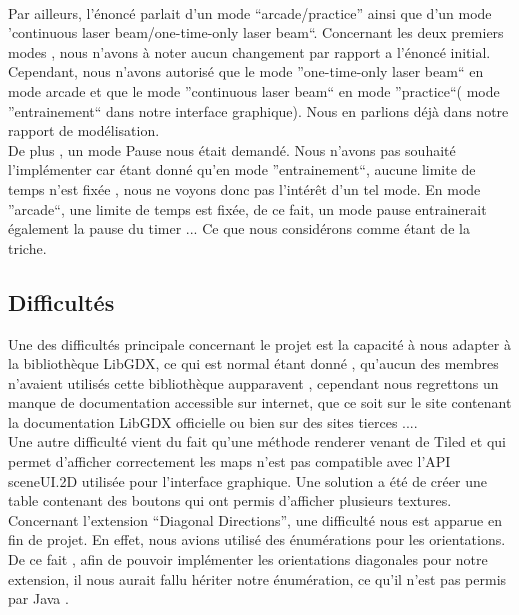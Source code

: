 \documentclass[a4paper,10pt]{article}
\begin{document}
\\
Par ailleurs, l'énoncé parlait d'un mode ``arcade/practice'' ainsi que d'un mode 'continuous laser beam/one-time-only laser beam``. Concernant les
deux premiers modes , nous n'avons à noter aucun changement par rapport a l'énoncé initial. Cependant, nous n'avons autorisé que le mode ''one-time-only laser beam``
en mode arcade et que le mode ''continuous laser beam`` en mode ''practice``( mode ''entrainement`` dans notre interface graphique).
Nous en parlions déjà dans notre rapport de modélisation.
\\
De plus , un mode Pause nous était demandé. Nous n'avons pas souhaité l'implémenter car étant donné qu'en mode ''entrainement``, aucune limite de
temps n'est fixée , nous ne voyons donc pas l'intérêt d'un tel mode. En mode ''arcade``, une limite de temps est fixée, de ce fait, un mode pause entrainerait
également la pause du timer ... Ce que nous considérons comme étant de la triche.
\subsection{Difficultés}
Une des difficultés principale concernant le projet est la capacité à nous adapter à la bibliothèque LibGDX, ce qui est normal étant donné , qu'aucun des membres
n'avaient utilisés cette bibliothèque aupparavent , cependant nous regrettons un manque de documentation accessible sur internet, que ce soit sur 
le site contenant la documentation LibGDX officielle ou bien sur des sites tierces ....
\\
Une autre difficulté vient du fait qu'une méthode renderer venant de Tiled et qui permet d'afficher correctement les maps n'est pas compatible avec
l'API sceneUI.2D utilisée pour l'interface graphique. Une solution a été de créer une table contenant des boutons qui ont permis d'afficher plusieurs
textures.
\\
Concernant l'extension ``Diagonal Directions'', une difficulté nous est apparue en fin de projet. En effet, nous avions utilisé des énumérations pour
les orientations. De ce fait , afin de pouvoir implémenter les orientations diagonales pour notre extension, il nous aurait fallu hériter notre énumération,
 ce qu'il n'est pas permis par Java .
\end{document}
